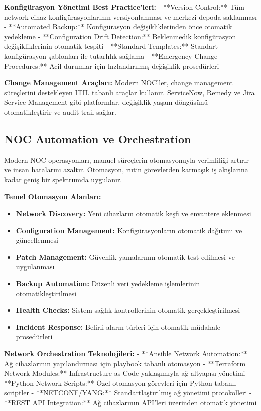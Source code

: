 \textbf{Konfigürasyon Yönetimi Best Practice'leri:}
- **Version Control:** Tüm network cihaz konfigürasyonlarının versiyonlanması ve merkezi depoda saklanması
- **Automated Backup:** Konfigürasyon değişikliklerinden önce otomatik yedekleme
- **Configuration Drift Detection:** Beklenmedik konfigürasyon değişikliklerinin otomatik tespiti
- **Standard Templates:** Standart konfigürasyon şablonları ile tutarlılık sağlama
- **Emergency Change Procedures:** Acil durumlar için hızlandırılmış değişiklik prosedürleri

\textbf{Change Management Araçları:}
Modern NOC'ler, change management süreçlerini destekleyen ITIL tabanlı araçlar kullanır. ServiceNow, Remedy ve Jira Service Management gibi platformlar, değişiklik yaşam döngüsünü otomatikleştirir ve audit trail sağlar.

\subsection{NOC Automation ve Orchestration}

Modern NOC operasyonları, manuel süreçlerin otomasyonuyla verimliliği artırır ve insan hatalarını azaltır. Otomasyon, rutin görevlerden karmaşık iş akışlarına kadar geniş bir spektrumda uygulanır.

\textbf{Temel Otomasyon Alanları:}
\begin{itemize}
    \item \textbf{Network Discovery:} Yeni cihazların otomatik keşfi ve envantere eklenmesi
    \item \textbf{Configuration Management:} Konfigürasyonların otomatik dağıtımı ve güncellenmesi
    \item \textbf{Patch Management:} Güvenlik yamalarının otomatik test edilmesi ve uygulanması
    \item \textbf{Backup Automation:} Düzenli veri yedekleme işlemlerinin otomatikleştirilmesi
    \item \textbf{Health Checks:} Sistem sağlık kontrollerinin otomatik gerçekleştirilmesi
    \item \textbf{Incident Response:} Belirli alarm türleri için otomatik müdahale prosedürleri
\end{itemize}

\textbf{Network Orchestration Teknolojileri:}
- **Ansible Network Automation:** Ağ cihazlarının yapılandırması için playbook tabanlı otomasyon
- **Terraform Network Modules:** Infrastructure as Code yaklaşımıyla ağ altyapısı yönetimi
- **Python Network Scripts:** Özel otomasyon görevleri için Python tabanlı scriptler
- **NETCONF/YANG:** Standartlaştırılmış ağ yönetimi protokolleri
- **REST API Integration:** Ağ cihazlarının API'leri üzerinden otomatik yönetimi

